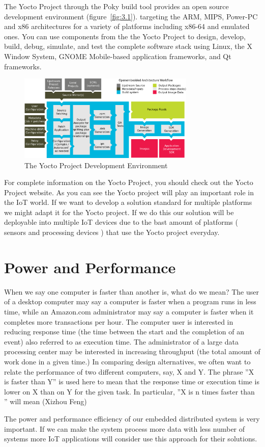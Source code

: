 The Yocto Project through the Poky build tool provides an open source
development environment (figure~\ref{fig:3.1}). targeting the ARM, MIPS,
Power-PC and x86 architectures for a variety of platforms including x86-64 and
emulated ones.  You can use components from the the Yocto Project to design,
develop, build, debug, simulate, and test the complete software stack using
Linux, the X Window System, GNOME Mobile-based application frameworks, and Qt
frameworks. 

\begin{figure}[H]
\centering
\includegraphics[width=0.75\textwidth]{images/yocto-environment.png}
\caption{The Yocto Project Development Environment}
\label{fig:3.2}
\end{figure}

For complete information on the Yocto Project, you should check out the Yocto
Project website\cite{yocto-project}. As you can see the Yocto project will play
an important role in the IoT world. If we want to develop a solution standard
for multiple platforms we might adapt it for the Yocto project. If we do this
our solution will be deployable into multiple IoT devices due to the bast
amount of platforms ( sensors and processing devices ) that use the Yocto
project everyday.

\section{Power and Performance}

\noindent
When we say one computer is faster than another is, what do we mean? The user
of a desktop computer may say a computer is faster when a program runs in less
time, while an Amazon.com administrator may say a computer is faster when it
completes more transactions per hour. The computer user is interested in 
reducing response time (the time between the start and the completion of an 
event) also referred to as execution time. The administrator of a large data 
processing center may be interested in increasing throughput (the total amount 
of work done in a given time.) In comparing design alternatives, we often want
to relate the performance of two different computers, say, X and Y. The phrase 
''X is faster than Y'' is used here to mean that the response time or execution 
time is lower on X than on Y for the given task. In particular, ''X is n times 
faster than ''  will mean (Xizhou Feng)

The power and performance efficiency of our embedded distributed system is very
important. If we can  make the system process more data with less number
of systems more IoT applications will consider use this approach for their
solutions.

\clearpage
